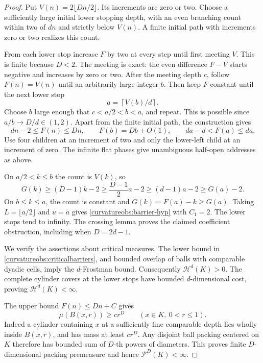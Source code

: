 \begin{proof}
Put \(V(n)=2\lfloor Dn/2\rfloor\). Its increments are zero or two.
Choose a sufficiently large initial lower stopping depth, with an
even branching count within two of \(dn\) and strictly below \(V(n)\).
A finite initial path with increments zero or two realizes this count.

From each lower stop increase \(F\) by two at every step until first
meeting \(V\). This is finite because \(D<2\). The meeting is exact:
the even difference \(F-V\) starts negative and increases by zero
or two. After the meeting depth \(c\), follow \(F(n)=V(n)\) until
an arbitrarily large integer \(b\). Then keep \(F\) constant until
the next lower stop
\[
 a=\left\lceil V(b)/d\right\rceil.
\]
Choose \(b\) large enough that \(c<a/2<b<a\), and repeat. This
is possible since \(a/b\to D/d\in(1,2)\).
Apart from the finite initial path, the construction gives
\begin{equation}\label{curvatureobs:criticalbarriers}
 dn-2\le F(n)\le Dn,\qquad
 F(b)=Db+O(1),\qquad da-d<F(a)\le da.
\end{equation}
Use four children at an increment of two and only the lower-left
child at an increment of zero. The infinite flat phases give
unambiguous half-open addresses as above.

On \(a/2<k\le b\) the count is \(V(k)\), so
\[
 G(k)\ge(D-1)k-2
       \ge\frac{D-1}{2}a-2
       \ge(d-1)a-2\ge G(a)-2.
\]
On \(b\le k\le a\), the count is constant and
\(G(k)=F(a)-k\ge G(a)\). Taking \(L=\lfloor a/2\rfloor\)
and \(u=a\) gives \eqref{curvatureobs:barrier-hyp} with \(C_1=2\).
The lower stops tend to infinity. The crossing lemma proves the
claimed coefficient obstruction, including when \(D=2d-1\).

We verify the assertions about critical measures. The lower bound
in \eqref{curvatureobs:criticalbarriers}, and bounded overlap of
balls with comparable dyadic cells, imply the \(d\)-Frostman bound.
Consequently \(\mathcal H^d(K)>0\). The complete cylinder covers
at the lower stops have bounded \(d\)-dimensional cost, proving
\(\mathcal H^d(K)<\infty\).

The upper bound \(F(n)\le Dn+C\) gives
\[
 \mu(B(x,r))\ge c r^D\qquad(x\in K,\ 0<r\le1).
\]
Indeed a cylinder containing \(x\) at a sufficiently fine comparable
depth lies wholly inside \(B(x,r)\), and has mass at least
\(c r^D\). Any disjoint ball packing centered on \(K\) therefore
has bounded sum of \(D\)-th powers of diameters. This proves finite
\(D\)-dimensional packing premeasure and hence
\(\mathcal P^D(K)<\infty\).


\end{proof}
